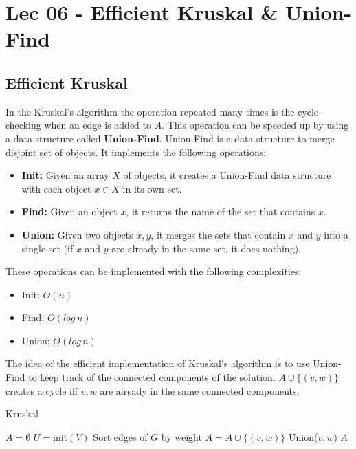 \chapter{Lec 06 - Efficient Kruskal \& Union-Find}

\section{Efficient Kruskal}
In the Kruskal's algorithm the operation repeated many times is the cycle-checking when an edge is added to $A$. This operation can be speeded up by using a data structure called \textbf{Union-Find}. Union-Find is a data structure to merge disjoint set of objects. It implements the following operations:
\begin{itemize}
    \item \textbf{Init:} Given an array $X$ of objects, it creates a Union-Find data structure with each object $x \in X$ in its own set.

    \item \textbf{Find:} Given an object $x$, it returns the name of the set that contains $x$.

    \item \textbf{Union:} Given two objects $x, y$, it merges the sets that contain $x$ and $y$ into a single set (if $x$ and $y$ are already in the same set, it does nothing).
\end{itemize}
These operations can be implemented with the following complexities:
\begin{itemize}
    \item Init: $O(n)$
    \item Find: $O(log\,n)$
    \item Union: $O(log\, n)$
\end{itemize}
The idea of the efficient implementation of Kruskal's algorithm is to use Union-Find to keep track of the connected components of the solution. $A \cup \{(v, w)\}$ creates a cycle iff $v, w$ are already in the same connected components.
\begin{algorithm}
\caption{Kruskal}\label{kruskal}
    \begin{algorithmic}[1]
        \State $A = \emptyset$
        \State $U = \text{init}(V)$
        \State Sort edges of $G$ by weight
                \State $A = A \cup \{(v, w)\}$
                \State Union($v, w$)
            \EndIf
        \EndFor
        \Return $A$
    \EndProcedure
    \end{algorithmic}
\end{algorithm}
